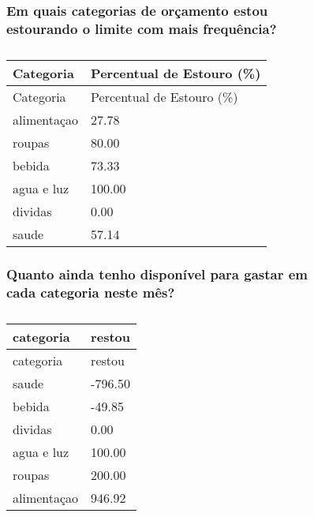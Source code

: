 \documentclass[
  8pt,
  a4paper,
  DIV=11,
  numbers=noendperiod]{scrartcl}
\begin{document}
\begin{figure}

\begin{minipage}{0.50\linewidth}

\subsubsection{Em quais categorias de orçamento estou estourando o
limite com mais
frequência?}\label{em-quais-categorias-de-oruxe7amento-estou-estourando-o-limite-com-mais-frequuxeancia}

\begin{longtable}[]{@{}ll@{}}
\caption{}\label{T_559a4}\tabularnewline
\toprule\noalign{}
Categoria & Percentual de Estouro (\%) \\
\midrule\noalign{}
\endfirsthead
\toprule\noalign{}
Categoria & Percentual de Estouro (\%) \\
\midrule\noalign{}
\endhead
\bottomrule\noalign{}
\endlastfoot
alimentaçao & 27.78 \\
roupas & 80.00 \\
bebida & 73.33 \\
agua e luz & 100.00 \\
dividas & 0.00 \\
saude & 57.14 \\
\end{longtable}

\end{minipage}%
%
\begin{minipage}{0.50\linewidth}

\subsubsection{Quanto ainda tenho disponível para gastar em cada
categoria neste
mês?}\label{quanto-ainda-tenho-disponuxedvel-para-gastar-em-cada-categoria-neste-muxeas}

\begin{longtable}[]{@{}ll@{}}
\caption{}\label{T_e9eef}\tabularnewline
\toprule\noalign{}
categoria & restou \\
\midrule\noalign{}
\endfirsthead
\toprule\noalign{}
categoria & restou \\
\midrule\noalign{}
\endhead
\bottomrule\noalign{}
\endlastfoot
saude & -796.50 \\
bebida & -49.85 \\
dividas & 0.00 \\
agua e luz & 100.00 \\
roupas & 200.00 \\
alimentaçao & 946.92 \\
\end{longtable}

\end{minipage}%

\end{figure}%
\end{document}

